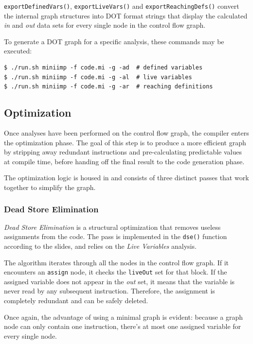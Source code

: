 \documentclass[12pt]{article}
\newcommand{\Code}[1]{\texttt{#1}}
\begin{document}
\Code{exportDefinedVars()}, \Code{exportLiveVars()} and
\Code{exportReachingDefs()} convert the internal graph structures into DOT
format strings that display the calculated \textit{in} and \textit{out} data
sets for every single node in the control flow graph.

To generate a DOT graph for a specific analysis, these commands may be executed:
\begin{verbatim}
$ ./run.sh miniimp -f code.mi -g -ad  # defined variables
$ ./run.sh miniimp -f code.mi -g -al  # live variables
$ ./run.sh miniimp -f code.mi -g -ar  # reaching definitions
\end{verbatim}

\subsection{Optimization}

Once analyses have been performed on the control flow graph, the compiler enters
the optimization phase. The goal of this step is to produce a more efficient
graph by stripping away redundant instructions and pre-calculating predictable
values at compile time, before handing off the final result to the code
generation phase.

The optimization logic is housed in  and consists of
three distinct passes that work together to simplify the graph.

\subsubsection{Dead Store Elimination}

\textit{Dead Store Elimination} is a structural optimization that removes
useless assignments from the code. The pass is implemented in the \Code{dse()}
function according to the slides, and relies on the \textit{Live Variables}
analysis.

The algorithm iterates through all the nodes in the control flow graph. If it
encounters an \Code{assign} node, it checks the \Code{liveOut} set for that
block. If the assigned variable does not appear in the \textit{out} set, it
means that the variable is never read by any subsequent instruction. Therefore,
the assignment is completely redundant and can be safely deleted.

Once again, the advantage of using a minimal graph is evident: because a graph
node can only contain one instruction, there's at most one assigned variable for
every single node.
\end{document}
